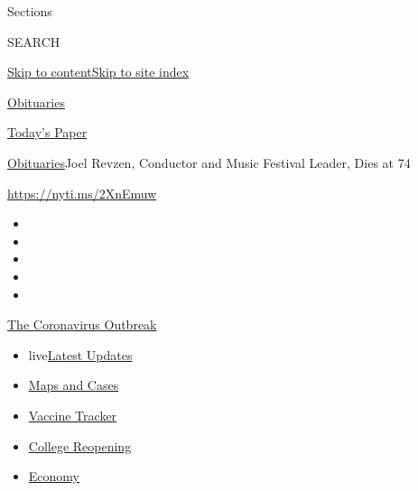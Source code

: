 Sections

SEARCH

\protect\hyperlink{site-content}{Skip to
content}\protect\hyperlink{site-index}{Skip to site index}

\href{https://www.nytimes.com/section/obituaries}{Obituaries}

\href{https://myaccount.nytimes.com/auth/login?response_type=cookie\&client_id=vi}{}

\href{https://www.nytimes.com/section/todayspaper}{Today's Paper}

\href{/section/obituaries}{Obituaries}\textbar{}Joel Revzen, Conductor
and Music Festival Leader, Dies at 74

\url{https://nyti.ms/2XnEmuw}

\begin{itemize}
\item
\item
\item
\item
\item
\end{itemize}

\href{https://www.nytimes.com/news-event/coronavirus?action=click\&pgtype=Article\&state=default\&region=TOP_BANNER\&context=storylines_menu}{The
Coronavirus Outbreak}

\begin{itemize}
\tightlist
\item
  live\href{https://www.nytimes.com/2020/08/03/world/coronavirus-covid-19.html?action=click\&pgtype=Article\&state=default\&region=TOP_BANNER\&context=storylines_menu}{Latest
  Updates}
\item
  \href{https://www.nytimes.com/interactive/2020/us/coronavirus-us-cases.html?action=click\&pgtype=Article\&state=default\&region=TOP_BANNER\&context=storylines_menu}{Maps
  and Cases}
\item
  \href{https://www.nytimes.com/interactive/2020/science/coronavirus-vaccine-tracker.html?action=click\&pgtype=Article\&state=default\&region=TOP_BANNER\&context=storylines_menu}{Vaccine
  Tracker}
\item
  \href{https://www.nytimes.com/2020/08/02/us/covid-college-reopening.html?action=click\&pgtype=Article\&state=default\&region=TOP_BANNER\&context=storylines_menu}{College
  Reopening}
\item
  \href{https://www.nytimes.com/live/2020/08/03/business/stock-market-today-coronavirus?action=click\&pgtype=Article\&state=default\&region=TOP_BANNER\&context=storylines_menu}{Economy}
\end{itemize}

